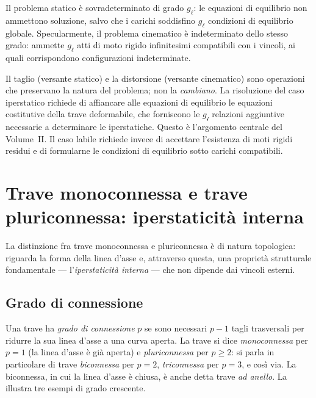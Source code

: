 Il problema statico è sovradeterminato di grado
$g_\ell$: le equazioni di equilibrio non ammettono
soluzione, salvo che i carichi soddisfino $g_\ell$
condizioni di equilibrio globale. Specularmente, il
problema cinematico è indeterminato dello stesso grado:
ammette $g_\ell$ atti di moto rigido infinitesimi
compatibili con i vincoli, ai quali corrispondono
configurazioni indeterminate.

\begin{oss}
	Il taglio (versante statico) e la distorsione
	(versante cinematico) sono operazioni che
	preservano la natura del problema; non la
	\emph{cambiano}. La risoluzione del caso
	iperstatico richiede di affiancare alle
	equazioni di equilibrio le equazioni
	costitutive della trave deformabile, che
	forniscono le $g_{\mathscr{i}}$ relazioni
	aggiuntive necessarie a determinare le
	iperstatiche. Questo è l'argomento centrale
	del Volume~II. Il caso labile richiede invece
	di accettare l'esistenza di moti rigidi residui
	e di formularne le condizioni di equilibrio
	sotto carichi compatibili.
\end{oss}



\section{Trave monoconnessa e trave pluriconnessa: iperstaticità interna}
\label{sec:connessione}

La distinzione fra trave monoconnessa e pluriconnessa
è di natura topologica: riguarda la forma della linea
d'asse e, attraverso questa, una proprietà strutturale
fondamentale --- l'\emph{iperstaticità interna} ---
che non dipende dai vincoli esterni.

\subsection{Grado di connessione}
\label{sec:grado_connessione}


Una trave ha \emph{grado di connessione} $p$ se
sono necessari $p-1$ tagli trasversali per ridurre
la sua linea d'asse a una curva aperta. La trave
si dice \emph{monoconnessa} per $p = 1$ (la linea
d'asse è già aperta) e \emph{pluriconnessa} per
$p \geq 2$: si parla in particolare di trave
\emph{biconnessa} per $p = 2$, \emph{triconnessa}
per $p = 3$, e così via. La biconnessa, in cui la
linea d'asse è chiusa, è anche detta trave
\emph{ad anello}. La  illustra tre esempi
di grado crescente.


